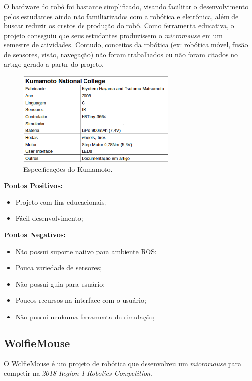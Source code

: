 \hspace{0.5cm} O hardware do robô foi bastante simplificado, visando facilitar o desenvolvimento pelos estudantes ainda não familiarizados com a robótica e eletrônica, além de buscar reduzir os custos de produção do robô. Como ferramenta educativa, o projeto conseguiu que seus estudantes produzissem o \textit{micromouse} em um semestre de atividades. Contudo, conceitos da robótica (ex: robótica móvel, fusão de sensores, visão, navegação) não foram trabalhados ou não foram citados no artigo gerado a partir do projeto.


\begin{figure}[H]
	\centering
	\includegraphics[width=0.7\textwidth]
	{Figures/Kumamoto.png}
	\caption{\label{fig:Kumamoto} Especificações do Kumamoto.}
\end{figure}


\textbf{Pontos Positivos:}
\begin{itemize}
	\item Projeto com fins educacionais;
	\item Fácil desenvolvimento;
\end{itemize}

\textbf{Pontos Negativos:}
\begin{itemize}
	\item Não possui suporte nativo para ambiente ROS;
	\item Pouca variedade de sensores;
	\item Não possui guia para usuário;
	\item Poucos recursos na interface com o usuário;
	\item Não possui nenhuma ferramenta de simulação;
\end{itemize}


\subsection{WolfieMouse}
\hspace{0.5cm} O WolfieMouse é um projeto de robótica que desenvolveu um \textit{micromouse} para competir na \textit{2018 Region 1 Robotics Competition}.

